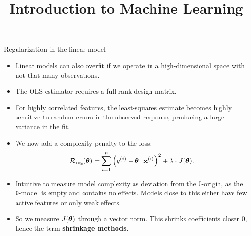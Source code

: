 \documentclass[11pt,compress,t,notes=noshow, xcolor=table]{beamer}
\title{Introduction to Machine Learning}
\date{}
\begin{document}


\begin{vbframe}{Regularization in the linear model}

  \begin{itemize}
  \item Linear models can also overfit if we operate in a high-dimensional space with not that many observations.    
  \item The OLS estimator requires a full-rank design matrix.
  \item For highly correlated features, the least-squares estimate becomes highly sensitive to random errors in the observed response, producing a large variance in the fit. 
  \item We now add a complexity penalty to the loss:
  $$
  \mathcal{R}_{\text{reg}}(\bm{\theta}) = \sum\limits_{i=1}^n \left(y^{(i)} - \bm{\theta}^\top \mathbf{x}^{(i)} \right)^2 + \lambda \cdot J(\bm{\theta}). 
  $$ 
  \item Intuitive to measure model complexity as deviation from the 0-origin, as the 0-model is empty and contains no effects. Models close to this either have few active features or only weak effects. 
  \item So we measure $J(\bm{\theta})$ through a vector norm.
    This shrinks coefficients closer 0, hence the term \textbf{shrinkage methods}.
  \end{itemize}

\end{vbframe}


\end{document}
